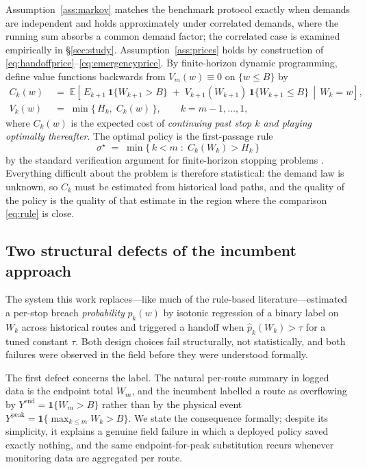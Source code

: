 \documentclass[preprint,authoryear,12pt]{elsarticle}
\theoremstyle{definition}
\theoremstyle{remark}
\begin{document}
Assumption~\ref{ass:markov} matches the benchmark protocol exactly when
demands are independent and holds approximately under correlated
demands, where the running sum absorbs a common demand factor; the
correlated case is examined empirically in \S\ref{sec:study}.
Assumption~\ref{ass:prices} holds by construction of
\eqref{eq:handoffprice}--\eqref{eq:emergencyprice}. By finite-horizon
dynamic programming, define value functions backwards from
$V_m(w) \equiv 0$ on $\{w \le B\}$ by
\begin{align}
  C_k(w) &\;=\;
  \mathbb E\!\left[\,
    E_{k+1}\,\mathbf 1\{W_{k+1} > B\}
    \;+\; V_{k+1}(W_{k+1})\,\mathbf 1\{W_{k+1} \le B\}
    \,\middle|\, W_k = w \right],
  \label{eq:contvalue}\\[3pt]
  V_k(w) &\;=\; \min\{\, H_k ,\; C_k(w) \,\}, \qquad k = m-1,\dots,1 ,
  \label{eq:bellman}
\end{align}
where $C_k(w)$ is the expected cost of \emph{continuing past stop $k$
and playing optimally thereafter}. The optimal policy is the
first-passage rule
\begin{equation}\label{eq:rule}
  \sigma^\star \;=\; \min\{\,k < m \;:\; C_k(W_k) > H_k \,\}
\end{equation}
by the standard verification argument for finite-horizon stopping
problems \citep{chow1971great,peskir2006optimal}. Everything difficult
about the problem is therefore statistical: the demand law is unknown,
so $C_k$ must be estimated from historical load paths, and the quality
of the policy is the quality of that estimate in the region where the
comparison \eqref{eq:rule} is close.

\subsection{Two structural defects of the incumbent approach}
\label{sec:defects}

The system this work replaces---like much of the rule-based
literature---estimated a per-stop breach \emph{probability}
$p_k(w)$ by isotonic regression of a binary label on $W_k$ across
historical routes and triggered a handoff when
$\hat p_k(W_k) > \tau$ for a tuned constant $\tau$. Both design choices
fail structurally, not statistically, and both failures were observed in
the field before they were understood formally.

The first defect concerns the label. The natural per-route summary in
logged data is the endpoint total $W_m$, and the incumbent labelled a
route as overflowing by $Y^{\mathrm{end}} = \mathbf 1\{W_m > B\}$ rather
than by the physical event
$Y^{\mathrm{peak}} = \mathbf 1\{\max_{k \le m} W_k > B\}$. We state the
consequence formally; despite its simplicity, it explains a genuine
field failure in which a deployed policy saved exactly nothing, and the
same endpoint-for-peak substitution recurs whenever monitoring data are
aggregated per route.
\end{document}
